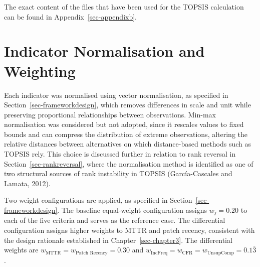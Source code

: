 \documentclass[
  12pt,
  letterpaper,
  12pt,
  oneside,
  english,
  onehalfspacing,
  headsepline]{MastersDoctoralThesis}
\begin{document}
\begin{samepage}
\end{samepage}

The exact content of the files that have been used for the TOPSIS
calculation can be found in Appendix~\ref{sec-appendixb}.

\section{Indicator Normalisation and
Weighting}\label{indicator-normalisation-and-weighting}

Each indicator was normalised using vector normalisation, as specified
in Section~\ref{sec-frameworkdesign}, which removes differences in scale
and unit while preserving proportional relationships between
observations. Min-max normalisation was considered but not adopted,
since it rescales values to fixed bounds and can compress the
distribution of extreme observations, altering the relative distances
between alternatives on which distance-based methods such as TOPSIS
rely. This choice is discussed further in relation to rank reversal in
Section~\ref{sec-rankreversal}, where the normalisation method is
identified as one of two structural sources of rank instability in
TOPSIS (García-Cascales and Lamata, 2012).

Two weight configurations are applied, as specified in
Section~\ref{sec-frameworkdesign}. The baseline equal-weight
configuration assigns \(w_j = 0.20\) to each of the five criteria and
serves as the reference case. The differential configuration assigns
higher weights to MTTR and patch recency, consistent with the design
rationale established in Chapter~\ref{sec-chapter3}. The differential
weights are \(w_{\text{MTTR}} = w_{\text{Patch Recency}} = 0.30\) and
\(w_{\text{IncFreq}} = w_{\text{CFR}} = w_{\text{UnsupComp}} = 0.1\overline{3}\).
\end{document}

